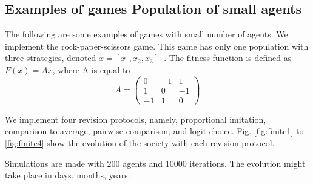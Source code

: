 \subsection{Examples of games Population of small agents}




The following are some examples of games with small number of agents. 
We implement the rock-paper-scissors game. This game has only one population with three strategies, denoted $x = [x_1, x_2, x_3]^\top$. The fitness function is defined as $F(x)=Ax$, where A is equal to 
\begin{equation}
  A = \begin{pmatrix}
  0  & -1 &  1 \\
  1  &  0 & -1 \\
  -1 &  1 & 0
  \end{pmatrix}
\end{equation}

We implement four revision protocols, namely, proportional imitation, comparison to average, pairwise comparison, and logit choice. Fig. \ref{fig:finite1} to \ref{fig:finite4} show the evolution of the society with each revision protocol.

Simulations are made with $200$ agents and 10000 iterations.
The evolution might take place in days, months, years.




